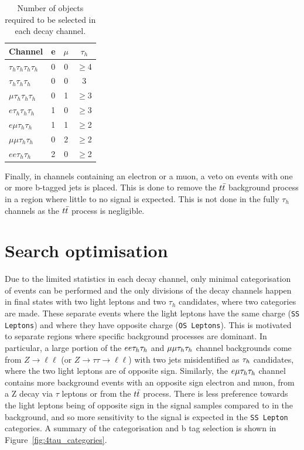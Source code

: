 \begin{table}[H]
   \centering
   \begin{tabular}{|l|c|c|c|}
   \hline
   \multicolumn{1}{|c|}{Channel} & e & $\mu$ & $\tau_h$ \\ \hline \hline
   $\tau_h \tau_h \tau_h \tau_h$ & 0 & 0     & $\geq$4        \\
   $\tau_h \tau_h \tau_h$        & 0 & 0     & 3        \\ 
   $\mu \tau_h \tau_h \tau_h$    & 0 & 1     & $\geq$3        \\
   $e \tau_h \tau_h \tau_h$      & 1 & 0     & $\geq$3        \\
   $e \mu \tau_h \tau_h$         & 1 & 1     & $\geq$2        \\
   $\mu \mu \tau_h \tau_h$       & 0 & 2     & $\geq$2        \\
   $e e \tau_h \tau_h$           & 2 & 0     & $\geq$2        \\ \hline
   \end{tabular}
   \caption[Number of objects required to be selected in each decay channel.]{Number of objects required to be selected in each decay channel.}
   \label{tab:leptonvetoes}
\end{table}

Finally, in channels containing an electron or a muon, a veto on events with one or more b-tagged jets is placed.
This is done to remove the $t\bar{t}$ background process in a region where little to no signal is expected.
This is not done in the fully $\tau_h$ channels as the $t\bar{t}$ process is negligible. \\

\section{Search optimisation}

Due to the limited statistics in each decay channel, only minimal categorisation of events can be performed and the only divisions of the decay channels happen in final states with two light leptons and two $\tau_h$ candidates, where two categories are made.
These separate events where the light leptons have the same charge (\texttt{SS Leptons}) and where they have opposite charge (\texttt{OS Leptons}).
This is motivated to separate regions where specific background processes are dominant.
In particular, a large portion of the $ee\tau_{h}\tau_{h}$ and $\mu\mu\tau_{h}\tau_{h}$ channel backgrounds come from $Z\rightarrow \ell\ell$ (or $Z\rightarrow\tau\tau\rightarrow \ell\ell$) with two jets misidentified as $\tau_{h}$ candidates, where the two light leptons are of opposite sign.
Similarly, the $e\mu\tau_{h}\tau_{h}$ channel contains more background events with an opposite sign electron and muon, from a Z decay via $\tau$ leptons or from the $t\bar{t}$ process.
There is less preference towards the light leptons being of opposite sign in the signal samples compared to in the background, and so more sensitivity to the signal is expected in the \texttt{SS Lepton} categories. 
A summary of the categorisation and b tag selection is shown in Figure~\ref{fig:4tau_categories}. \\

